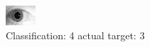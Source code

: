 \begin{figure}[h!]
\begin{center}
\includegraphics[width=0.60\columnwidth]{figures/ID1819_class_4_target_3.png}
\end{center}
\caption{ Classification: 4 actual target: 3}
\label{fig:ID1819_class_4_target_3}
\end{figure}
